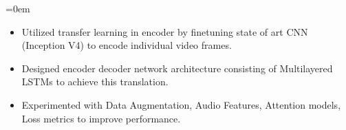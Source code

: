 \documentclass{article}
\makeatletter
\newcommand{\headerrow}[2]
{\begin{tabular*}{\linewidth}{l@{\extracolsep{\fill}}r}
    #1 &
    #2 \\
\end{tabular*}}
\makeatother
\begin{document}
\begin{list} {}{\leftmargin=0em}
\begin{itemize}
        \item Utilized transfer learning in encoder by finetuning state of art CNN (Inception V4) to encode individual video frames.
        \item Designed encoder decoder network architecture consisting of Multilayered LSTMs to achieve this translation.
        \item Experimented with Data Augmentation, Audio Features, Attention models, Loss metrics to improve performance.
    \end{itemize}
\end{list}
\end{document}
